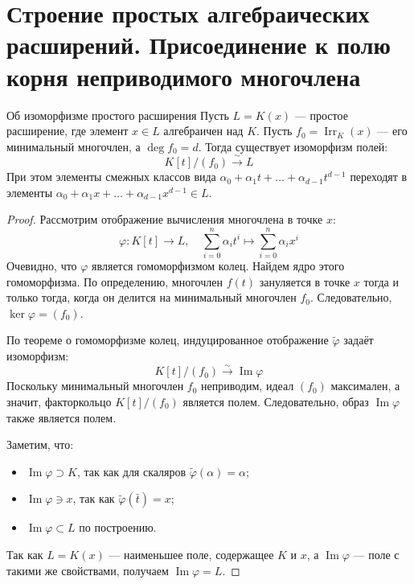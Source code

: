 
\section{Строение простых алгебраических расширений. Присоединение к полю корня неприводимого многочлена}

\begin{Theorem}{Об изоморфизме простого расширения}{}
	Пусть $L = K(x)$ --- простое расширение, где элемент $x \in L$ алгебраичен над $K$. Пусть $f_0 = \operatorname{Irr}_K(x)$ --- его минимальный многочлен, а $\deg f_0 = d$.
	Тогда существует изоморфизм полей:
	\[ K[t]/(f_0) \xrightarrow{\sim} L \]
	При этом элементы смежных классов вида $\alpha_0 + \alpha_1 t + \dots + \alpha_{d-1} t^{d-1}$ переходят в элементы $\alpha_0 + \alpha_1 x + \dots + \alpha_{d-1} x^{d-1} \in L$.
\end{Theorem}

\begin{proof}
	Рассмотрим отображение вычисления многочлена в точке $x$:
	\[ \varphi: K[t] \to L, \quad \sum_{i=0}^n \alpha_i t^i \mapsto \sum_{i=0}^n \alpha_i x^i \]
	Очевидно, что $\varphi$ является гомоморфизмом колец.
	Найдем ядро этого гомоморфизма. По определению, многочлен $f(t)$ зануляется в точке $x$ тогда и только тогда, когда он делится на минимальный многочлен $f_0$. Следовательно, $\ker \varphi = (f_0)$.

	По теореме о гомоморфизме колец, индуцированное отображение $\tilde{\varphi}$ задаёт изоморфизм:
	\[ K[t]/(f_0) \xrightarrow{\sim} \operatorname{Im} \varphi \]
	Поскольку минимальный многочлен $f_0$ неприводим, идеал $(f_0)$ максимален, а значит, факторкольцо $K[t]/(f_0)$ является полем. Следовательно, образ $\operatorname{Im} \varphi$ также является полем.

	Заметим, что:
	\begin{itemize}
		\item $\operatorname{Im} \varphi \supset K$, так как для скаляров $\tilde{\varphi}(\alpha) = \alpha$;
		\item $\operatorname{Im} \varphi \ni x$, так как $\tilde{\varphi}(\bar{t}) = x$;
		\item $\operatorname{Im} \varphi \subset L$ по построению.
	\end{itemize}
	Так как $L = K(x)$ --- наименьшее поле, содержащее $K$ и $x$, а $\operatorname{Im} \varphi$ --- поле с такими же свойствами, получаем $\operatorname{Im} \varphi = L$.
\end{proof}

